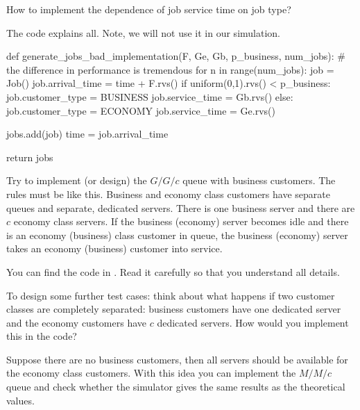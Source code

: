 \begin{exercise}
  How to implement the dependence of job service time on job type?

  \begin{solution}
The code explains all. Note, we will not use it in our simulation. 


\begin{pyverbatim}
def generate_jobs_bad_implementation(F, Ge, Gb, p_business, num_jobs):
    # the difference in performance is tremendous
    for n in range(num_jobs):
        job = Job()
        job.arrival_time = time + F.rvs()  
        if uniform(0,1).rvs() < p_business:
            job.customer_type = BUSINESS
            job.service_time = Gb.rvs()  
        else:
            job.customer_type = ECONOMY
            job.service_time = Ge.rvs()  

        jobs.add(job)
        time = job.arrival_time

    return jobs
        
\end{pyverbatim}
  \end{solution}
\end{exercise}

\begin{exercise}
  Try to implement (or design) the $G/G/c$ queue with business customers. The rules must be like this. Business and economy class customers have separate queues and separate, dedicated servers. There is one business server and there are $c$ economy class servers. If the business (economy) server becomes  idle and there is an economy (business) class customer in queue, the business (economy) server takes an economy (business) customer into service.

You can find the code in . Read it carefully so that you understand all details. 
\end{exercise}


\begin{exercise}
  To design some further test cases: think about what happens if two customer classes are completely separated:  business customers have one dedicated server and the economy customers have $c$ dedicated servers.  How would you implement this in the code? 
\end{exercise}

\begin{exercise}
  Suppose there are no business customers, then all servers should be available for the economy class customers. With this idea you can implement the $M/M/c$ queue and check whether the simulator gives the same results as the theoretical values. 
\end{exercise}

